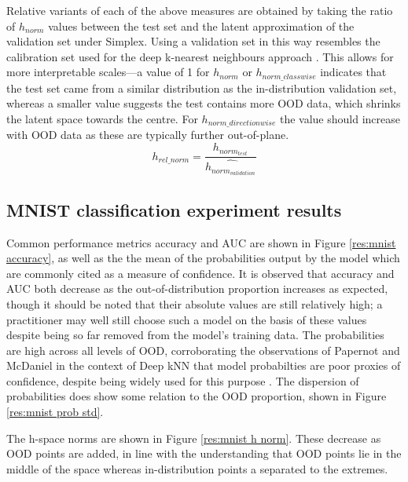 \documentclass{article}
\begin{document}
Relative variants of each of the above measures are obtained by taking the ratio of $h_{norm}$ values between the test set and the latent approximation of the validation set under Simplex. Using a validation set in this way resembles the calibration set used for the deep k-nearest neighbours approach \cite{papernot_deep_2018}. This allows for more interpretable scales---a value of 1 for $h_{norm}$ or $h_{norm\_classwise}$ indicates that the test set came from a similar distribution as the in-distribution validation set, whereas a smaller value suggests the test contains more OOD data, which shrinks the latent space towards the centre. For $h_{norm\_directionwise}$ the value should increase with OOD data as these are typically further out-of-plane.
\begin{equation}
\label{eq:relative h norm}
	h_{rel\_norm} = \frac{h_{norm_{test}}}{\hat{h_{norm_{validation}}}}
\end{equation}



\subsection{MNIST classification experiment results}
\label{sec:mnist results}
Common performance metrics accuracy and AUC are shown in Figure \ref{res:mnist accuracy}, as well as the the mean of the probabilities output by the model which are commonly cited as a measure of confidence. It is observed that accuracy and AUC both decrease as the out-of-distribution proportion increases as expected, though it should be noted that their absolute values are still relatively high; a practitioner may well still choose such a model on the basis of these values despite being so far removed from the model's training data.
The probabilities are high across all levels of OOD, corroborating the observations of Papernot and McDaniel in the context of Deep kNN that model probabilties are poor proxies of confidence, despite being widely used for this purpose \cite{papernot_deep_2018}. The dispersion of probabilities does show some relation to the OOD proportion, shown in Figure \ref{res:mnist prob std}.

The h-space norms are shown in Figure \ref{res:mnist h norm}. These decrease as OOD points are added, in line with the understanding that OOD points lie in the middle of the space whereas in-distribution points a separated to the extremes.
\end{document}
